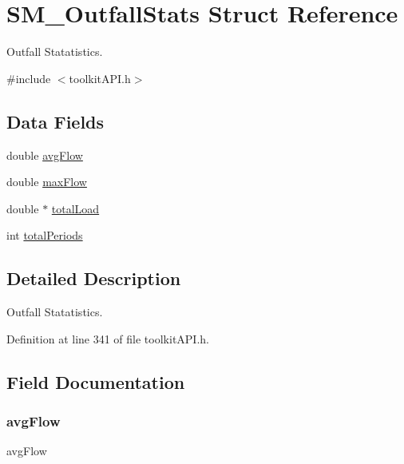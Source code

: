 \hypertarget{struct_s_m___outfall_stats}{}\section{S\+M\+\_\+\+Outfall\+Stats Struct Reference}
\label{struct_s_m___outfall_stats}


Outfall Statatistics.  




{\ttfamily \#include $<$toolkit\+A\+P\+I.\+h$>$}

\subsection*{Data Fields}
\begin{DoxyCompactItemize}
\item 
double \mbox{\hyperlink{struct_s_m___outfall_stats_afcd256ffd7ec0ed557f6dc62d9b83a52}{avg\+Flow}}
\item 
double \mbox{\hyperlink{struct_s_m___outfall_stats_a4d84bca5454f3903c44fe865e44674f5}{max\+Flow}}
\item 
double $\ast$ \mbox{\hyperlink{struct_s_m___outfall_stats_a07bf14d41a8a678b2cad797d53f84fa8}{total\+Load}}
\item 
int \mbox{\hyperlink{struct_s_m___outfall_stats_a60fffeca33e0487e4b7cac3898b2cf05}{total\+Periods}}
\end{DoxyCompactItemize}


\subsection{Detailed Description}
Outfall Statatistics. 

Definition at line 341 of file toolkit\+A\+P\+I.\+h.



\subsection{Field Documentation}
\mbox{\label{struct_s_m___outfall_stats_afcd256ffd7ec0ed557f6dc62d9b83a52}} 
\subsubsection{\texorpdfstring{avgFlow}{avgFlow}}
{\footnotesize\ttfamily avg\+Flow}

